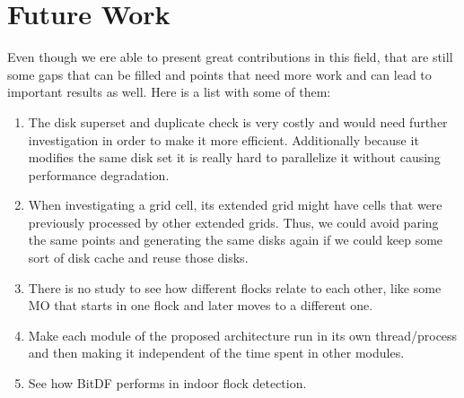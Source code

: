 \section{Future Work}
Even though we ere able to present great contributions in this field, that are still some gaps that can be filled and
points that need more work and can lead to important results as well. Here is a list with some of them:

\begin{enumerate}
    \item The disk superset and duplicate check is very costly and would need further investigation in order to make it
        more efficient. Additionally because it modifies the same disk set it is really hard to parallelize it without
        causing performance degradation.
    \item When investigating a grid cell, its extended grid might have cells that were previously processed by other
        extended grids. Thus, we could avoid paring the same points and generating the same disks again if we could keep
        some sort of disk cache and reuse those disks.
    \item There is no study to see how different flocks relate to each other, like some MO that starts in one flock and
        later moves to a different one.
    \item Make each module of the proposed architecture run in its own thread/process and then making it independent of
        the time spent in other modules.
    \item See how BitDF performs in indoor flock detection.
\end{enumerate}
%
%
